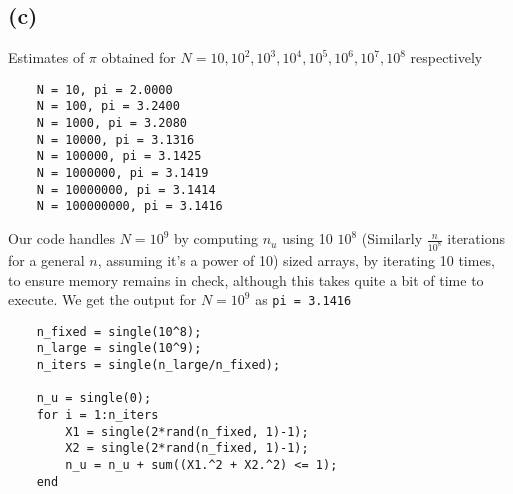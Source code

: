 \documentclass[11pt, fleqn]{article}
\begin{document}
\subsection*{(c)}
Estimates of $\pi$ obtained for $N = 10, 10^2, 10^3, 10^4, 10^5, 10^6, 10^7, 10^8$ respectively
\begin{verbatim}
    N = 10, pi = 2.0000 
    N = 100, pi = 3.2400 
    N = 1000, pi = 3.2080 
    N = 10000, pi = 3.1316 
    N = 100000, pi = 3.1425 
    N = 1000000, pi = 3.1419 
    N = 10000000, pi = 3.1414 
    N = 100000000, pi = 3.1416 
\end{verbatim}
Our code handles $N = 10^9$ by computing $n_u$ using 10 $10^8$ (Similarly $\frac{n}{10^8}$ iterations for a general $n$, assuming it's a power of 10) sized arrays, by iterating 10 times, to ensure memory remains in check, although this takes quite a bit of time to execute. We get the output for $N = 10^9$ as \texttt{pi = 3.1416}
\begin{verbatim}
    n_fixed = single(10^8);
    n_large = single(10^9);
    n_iters = single(n_large/n_fixed);
    
    n_u = single(0);
    for i = 1:n_iters
        X1 = single(2*rand(n_fixed, 1)-1);
        X2 = single(2*rand(n_fixed, 1)-1);
        n_u = n_u + sum((X1.^2 + X2.^2) <= 1);
    end
\end{verbatim}
\end{document}
